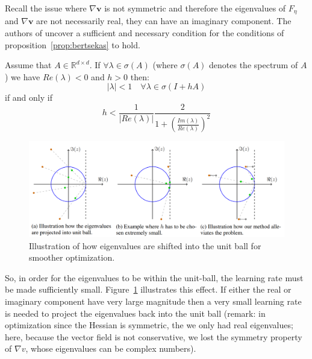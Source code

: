 \documentclass{article}
\renewcommand{\vec}[1]{\ensuremath{\boldsymbol{#1}}}
\begin{document}
Recall the issue where  $\nabla\vec{v}$ is not symmetric and therefore the eigenvalues of $F_\eta$ and $\nabla\vec{v}$ are not necessarily real, they can have an imaginary component. The authors of \cite{MeschederNG17a} uncover a sufficient and necessary condition for the conditions of proposition~\ref{prop:bertsekas} to hold.

\begin{lem} Assume that $A \in \mathbb{R}^{d\times d}$. If $\forall \lambda \in \sigma(A)$ (where $\sigma(A)$ denotes the spectrum of $A$) we have $Re(\lambda)<0$ and $h>0$ then:
\[
|\lambda| < 1 \quad \forall \lambda \in \sigma(I+hA)
\]
if and only if
\[
h < \frac{1}{|Re(\lambda)|} \frac{2}{1+(\frac{Im(\lambda)}{Re(\lambda)})^2}
\]
\end{lem}

\begin{figure}[h!]
    \centering
    \includegraphics[scale=0.45]{gans.PNG}
    \caption{Illustration of how eigenvalues are shifted into the unit ball for smoother optimization.}
    \label{fig:eval}
\end{figure}

So, in order for the eigenvalues to be within the unit-ball, the learning rate must be made sufficiently small. Figure~\ref{fig:eval} illustrates this effect. If either the real or imaginary component have very large magnitude then a very small learning rate is needed to project the eigenvalues back into the unit ball (remark: in optimization since the Hessian is symmetric, the we only had real eigenvalues; here, because the vector field is not conservative, we lost the symmetry property of $\nabla v$, whose eigenvalues can be complex numbers). 
\\
\end{document}
